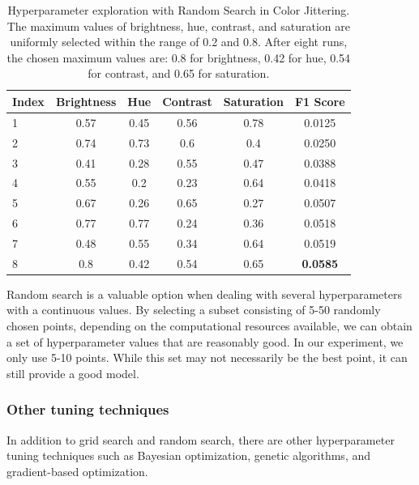 \begin{table}[ht]
\centering
\caption{Hyperparameter exploration with Random Search in Color Jittering. The maximum values of brightness, hue, contrast, and saturation are uniformly selected within the range of 0.2 and 0.8. After eight runs, the chosen maximum values are: 0.8 for brightness, 0.42 for hue, 0.54 for contrast, and 0.65 for saturation.}
\begin{tabular}{lccccc}
\toprule
Index & Brightness & Hue & Contrast & Saturation & F1 Score\\
\midrule
1 & 0.57 & 0.45 & 0.56 & 0.78 & 0.0125 \\
2 & 0.74 & 0.73 & 0.6 & 0.4 & 0.0250 \\
3 & 0.41 & 0.28 & 0.55 & 0.47 & 0.0388 \\
4 & 0.55 & 0.2 & 0.23 & 0.64 & 0.0418 \\
5 & 0.67 & 0.26 & 0.65 & 0.27 & 0.0507 \\
6 & 0.77 & 0.77 & 0.24 & 0.36 & 0.0518 \\
7 & 0.48 & 0.55 & 0.34 & 0.64 & 0.0519 \\
8 & 0.8 & 0.42 & 0.54 & 0.65 & \textbf{0.0585} \\
\bottomrule
\end{tabular}
\label{tab:random_search}
\end{table}

Random search is a valuable option when dealing with several hyperparameters with a continuous values. By selecting a subset consisting of 5-50 randomly chosen points, depending on the computational resources available, we can obtain a set of hyperparameter values that are reasonably good. In our experiment, we only use 5-10 points. While this set may not necessarily be the best point, it can still provide a good model.

\subsubsection{Other tuning techniques}
In addition to grid search and random search, there are other hyperparameter tuning techniques such as Bayesian optimization, genetic algorithms, and gradient-based optimization. 

